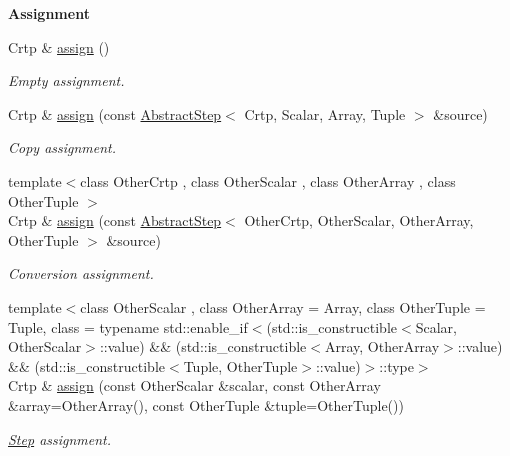 \begin{Indent}{\bf Assignment}\par
\begin{DoxyCompactItemize}
\item 
Crtp \& \hyperlink{classmagrathea_1_1AbstractStep_ab06748b8710a2411fb547e705671a5be}{assign} ()
\begin{DoxyCompactList}\small\item\em Empty assignment. \end{DoxyCompactList}\item 
Crtp \& \hyperlink{classmagrathea_1_1AbstractStep_a97e8a490a0dc0c387a9fe550eca8bf1a}{assign} (const \hyperlink{classmagrathea_1_1AbstractStep}{Abstract\-Step}$<$ Crtp, Scalar, Array, Tuple $>$ \&source)
\begin{DoxyCompactList}\small\item\em Copy assignment. \end{DoxyCompactList}\item 
{\footnotesize template$<$class Other\-Crtp , class Other\-Scalar , class Other\-Array , class Other\-Tuple $>$ }\\Crtp \& \hyperlink{classmagrathea_1_1AbstractStep_accb7357d8e533b0bca41cff35c0cc7e3}{assign} (const \hyperlink{classmagrathea_1_1AbstractStep}{Abstract\-Step}$<$ Other\-Crtp, Other\-Scalar, Other\-Array, Other\-Tuple $>$ \&source)
\begin{DoxyCompactList}\small\item\em Conversion assignment. \end{DoxyCompactList}\item 
{\footnotesize template$<$class Other\-Scalar , class Other\-Array  = Array, class Other\-Tuple  = Tuple, class  = typename std\-::enable\-\_\-if$<$(std\-::is\-\_\-constructible$<$\-Scalar, Other\-Scalar$>$\-::value) \&\& (std\-::is\-\_\-constructible$<$\-Array, Other\-Array$>$\-::value) \&\& (std\-::is\-\_\-constructible$<$\-Tuple, Other\-Tuple$>$\-::value)$>$\-::type$>$ }\\Crtp \& \hyperlink{classmagrathea_1_1AbstractStep_ac7c94a26fbeb808bb1c57d30dc1c0d38}{assign} (const Other\-Scalar \&scalar, const Other\-Array \&array=Other\-Array(), const Other\-Tuple \&tuple=Other\-Tuple())
\begin{DoxyCompactList}\small\item\em \hyperlink{exceptionmagrathea_1_1Step}{Step} assignment. \end{DoxyCompactList}\end{DoxyCompactItemize}
\end{Indent}
